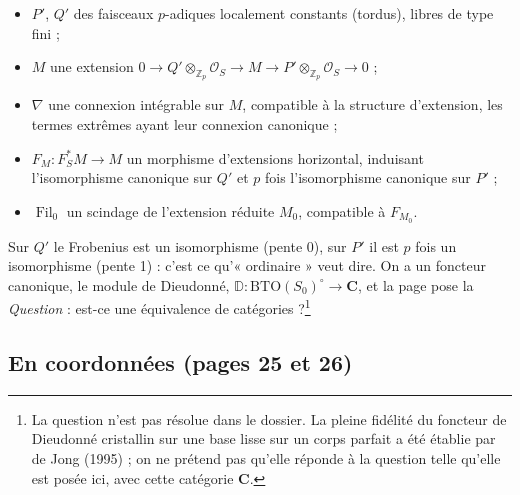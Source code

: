 \documentclass[11pt,a4paper]{article}
\begin{document}
\begin{itemize}
\item $P'$, $Q'$ des faisceaux $p$-adiques localement constants (tordus),
libres de type fini ;
\item $M$ une extension $0 \to Q' \otimes_{\mathbb{Z}_{p}} \mathcal{O}_{S}
\to M \to P' \otimes_{\mathbb{Z}_{p}} \mathcal{O}_{S} \to 0$ ;
\item $\nabla$ une connexion intégrable sur $M$, compatible à la structure
d'extension, les termes extrêmes ayant leur connexion canonique ;
\item $F_{M}\colon F_{S}^{*}M \to M$ un morphisme d'extensions horizontal,
induisant l'isomorphisme canonique sur $Q'$ et $p$ fois l'isomorphisme
canonique sur $P'$ ;
\item $\operatorname{Fil}_{0}$ un scindage de l'extension réduite $M_{0}$,
compatible à $F_{M_{0}}$.
\end{itemize}

Sur $Q'$ le Frobenius est un isomorphisme (pente 0), sur $P'$ il est $p$ fois
un isomorphisme (pente 1) : c'est ce qu'« ordinaire » veut dire. On a un
foncteur canonique, le module de Dieudonné,
$\mathbb{D}\colon \mathrm{BTO}(S_{0})^{\circ} \to \mathbf{C}$, et la page
pose la \emph{Question} : est-ce une équivalence de catégories ?\footnote{La
question n'est pas résolue dans le dossier. La pleine fidélité du foncteur de
Dieudonné cristallin sur une base lisse sur un corps parfait a été établie
par de Jong (1995) ; on ne prétend pas qu'elle réponde à la question telle
qu'elle est posée ici, avec cette catégorie $\mathbf{C}$.}

\subsection*{En coordonnées (pages 25 et 26)}
\end{document}
